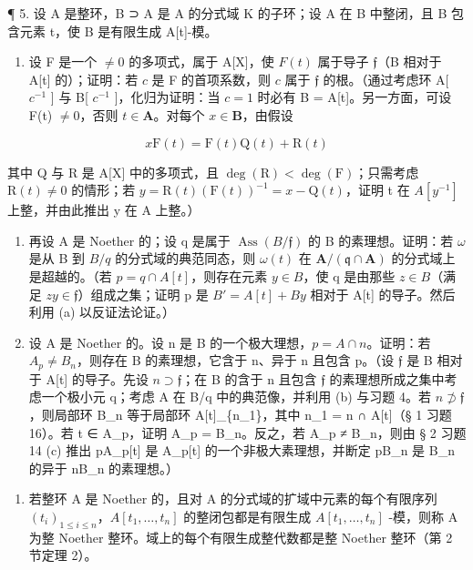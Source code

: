 ¶ 5. 设 A 是整环，B ⊃ A 是 A 的分式域 K 的子环；设 A 在 B 中整闭，且 B 包含元素 t，使 B 是有限生成 A{[}t{]}-模。

\begin{enumerate}
\def\labelenumi{(\alph{enumi})}
\tightlist
\item
  设 F 是一个 \(\neq 0\) 的多项式，属于 A{[}X{]}，使 \(F(t)\) 属于导子 \(\mathfrak{f}\)（B 相对于 A{[}t{]} 的）；证明：若 \(c\) 是 F 的首项系数，则 \(c\) 属于 \(\mathfrak{f}\) 的根。（通过考虑环 A{[} \(c^{-1}\) {]} 与 B{[} \(c^{-1}\) {]}，化归为证明：当 \(c = 1\) 时必有 B = A{[}t{]}。另一方面，可设 F(t) \(\neq 0\)，否则 \(t \in \mathbf{A}\)。对每个 \(x \in \mathbf{B}\)，由假设
\end{enumerate}

\[
x \mathrm{F} (t) = \mathrm{F} (t) \mathrm{Q} (t) + \mathrm{R} (t)
\]

其中 Q 与 R 是 A{[}X{]} 中的多项式，且 \(\deg(\mathrm{R}) < \deg(\mathrm{F})\)；只需考虑 \(\mathrm{R}(t) \neq 0\) 的情形；若 \(y = \mathrm{R}(t)(\mathrm{F}(t))^{-1} = x - \mathrm{Q}(t)\)，证明 t 在 \(A[y^{-1}]\) 上整，并由此推出 y 在 A 上整。）

\begin{enumerate}
\def\labelenumi{(\alph{enumi})}
\setcounter{enumi}{1}
\item
  再设 A 是 Noether 的；设 q 是属于 \(\operatorname{Ass}(B/\mathfrak{f})\) 的 B 的素理想。证明：若 \(\omega\) 是从 B 到 \(B/q\) 的分式域的典范同态，则 \(\omega(t)\) 在 \(\mathbf{A}/(\mathfrak{q} \cap \mathbf{A})\) 的分式域上是超越的。（若 \(p = q \cap A[t]\)，则存在元素 \(y \in B\)，使 q 是由那些 \(z \in B\)（满足 \(zy \in \mathfrak{f}\)）组成之集；证明 p 是 \(B' = A[t] + By\) 相对于 A{[}t{]} 的导子。然后利用 (a) 以反证法论证。）
\item
  设 A 是 Noether 的。设 n 是 B 的一个极大理想，\(p = A \cap n\)。证明：若 \(A_{p} \neq B_{n}\)，则存在 B 的素理想，它含于 n、异于 n 且包含 p。（设 \(\mathfrak{f}\) 是 B 相对于 A{[}t{]} 的导子。先设 \(n \supset \mathfrak{f}\)；在 B 的含于 n 且包含 \(\mathfrak{f}\) 的素理想所成之集中考虑一个极小元 q；考虑 A 在 B/q 中的典范像，并利用 (b) 与习题 4。若 \(n \not\supset \mathfrak{f}\)，则局部环 B\_n 等于局部环 A{[}t{]}\_\{n\_1\}，其中 n\_1 = n ∩ A{[}t{]}（§ 1 习题 16）。若 t ∈ A\_p，证明 A\_p = B\_n。反之，若 A\_p ≠ B\_n，则由 § 2 习题 14 (c) 推出 pA\_p{[}t{]} 是 A\_p{[}t{]} 的一个非极大素理想，并断定 pB\_n 是 B\_n 的异于 nB\_n 的素理想。）
\end{enumerate}

\begin{enumerate}
\def\labelenumi{\arabic{enumi}.}
\setcounter{enumi}{5}
\tightlist
\item
  若整环 A 是 Noether 的，且对 A 的分式域的扩域中元素的每个有限序列 \((t_{i})_{1\leq i\leq n}\)，\(A[t_{1},\ldots,t_{n}]\) 的整闭包都是有限生成 \(A[t_{1},\ldots,t_{n}]\) -模，则称 A 为整 Noether 整环。域上的每个有限生成整代数都是整 Noether 整环（第 2 节定理 2）。
\end{enumerate}

